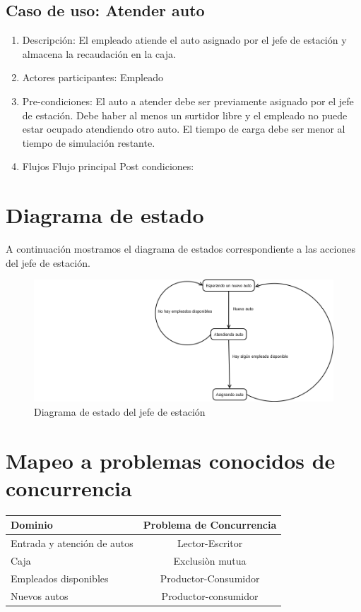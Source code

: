 \documentclass[12pt,a4paper,titlepage,oneside]{article}
\begin{document}
\subsection{Caso de uso: Atender auto}
\begin{enumerate}
\item Descripción: El empleado atiende el auto asignado por el jefe de estación y almacena la recaudación en la caja.
\item Actores participantes: Empleado
\item Pre-condiciones: El auto a atender debe ser previamente asignado por el jefe de estación. Debe haber al menos un surtidor libre y el empleado no puede estar ocupado atendiendo otro auto. El tiempo de carga debe ser menor al tiempo de simulación restante.
\item Flujos
Flujo principal
Post condiciones: 
\end{enumerate}
\newpage

\section{Diagrama de estado}

A continuación mostramos el diagrama de estados correspondiente a las acciones del jefe de estación.
\bigskip

\begin{figure}[hbtp]
\centering
\includegraphics[scale=0.5]{diagrama_estado_jefe.png}
\caption[Long caption]{Diagrama de estado del jefe de estación}
\end{figure}


\section{Mapeo a problemas conocidos de concurrencia}

\bigskip


\begin{center}
   \begin{tabular}[1.5\textwidth]{| l | c |}
     \hline
     Dominio & Problema de Concurrencia  \\ \hline
     Entrada y atención de autos & Lector-Escritor  \\ \hline
     Caja & Exclusiòn mutua\\ \hline
     Empleados disponibles & Productor-Consumidor\\ \hline
     Nuevos autos & Productor-consumidor\\ 
     \hline
   \end{tabular}
 \end{center}
 
\end{document}
